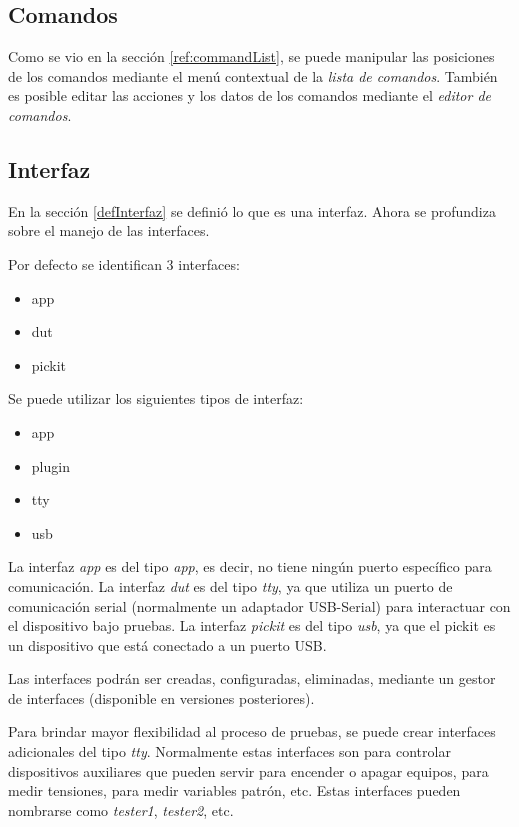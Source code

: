 \documentclass[a4paper,12pt]{refart}
\newcommand\commandList{\textit{lista de comandos}}
\newcommand\commandEditor{\textit{editor de comandos}}
\begin{document}
\subsection{Comandos}
Como se vio en la sección \ref{ref:commandList}, se puede manipular las posiciones de los comandos mediante el menú contextual de la \commandList{}. También es posible editar las acciones y los datos de los comandos mediante el \commandEditor{}.

\subsection{Interfaz}
En la sección \ref{defInterfaz} se definió lo que es una interfaz. Ahora se profundiza sobre el manejo de las interfaces.

Por defecto se identifican 3 interfaces:
\begin{itemize}[noitemsep]
\item app
\item dut
\item pickit
\end{itemize}

Se puede utilizar los siguientes tipos de interfaz:
\begin{itemize}[noitemsep]
\item app
\item plugin
\item tty
\item usb
\end{itemize}

La interfaz \textit{app} es del tipo \textit{app}, es decir, no tiene ningún puerto específico para comunicación. La interfaz \textit{dut} es del tipo \textit{tty}, ya que utiliza un puerto de comunicación serial (normalmente un adaptador USB-Serial) para interactuar con el dispositivo bajo pruebas. La interfaz \textit{pickit} es del tipo \textit{usb}, ya que el pickit es un dispositivo que está conectado a un puerto USB.

\medskip

\begin{leftbar}
Las interfaces podrán ser creadas, configuradas, eliminadas, mediante un gestor de interfaces (disponible en versiones posteriores).
\end{leftbar}

Para brindar mayor flexibilidad al proceso de pruebas, se puede crear interfaces adicionales del tipo \textit{tty}. Normalmente estas interfaces son para controlar dispositivos auxiliares que pueden servir para encender o apagar equipos, para medir tensiones, para medir variables patrón, etc. Estas interfaces pueden nombrarse como \textit{tester1}, \textit{tester2}, etc.
\end{document}
